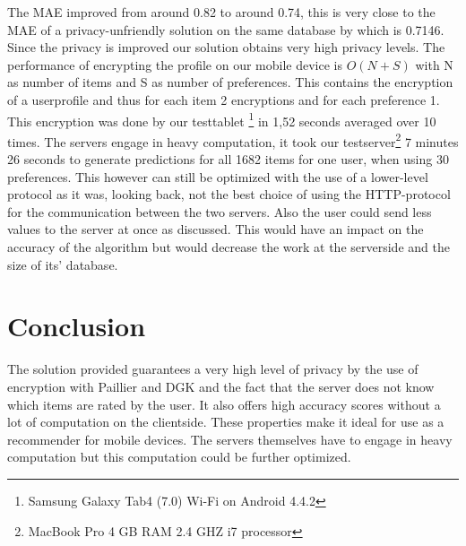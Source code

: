\documentclass[twocolumn]{phdsymp} %
\begin{document}
The MAE improved from around 0.82 to around 0.74, this is very close to the MAE of a privacy-unfriendly solution on the same database by \cite{rand} which is 0.7146. Since the privacy is improved our solution  obtains very high privacy levels. The performance of encrypting the profile on our mobile device is $O(N+S)$ with N as number of items and S as number of preferences. This contains the encryption of a userprofile and thus for each item 2 encryptions and for each preference 1. This encryption was done by our testtablet \footnote{Samsung Galaxy Tab4 (7.0) Wi-Fi on Android 4.4.2} in 1,52 seconds averaged over 10 times. The servers engage in heavy computation, it took our testserver\footnote{MacBook Pro 4 GB RAM 2.4 GHZ i7 processor} 7 minutes 26 seconds to generate predictions for all 1682 items for one user, when using 30 preferences. This however can still be optimized with the use of a lower-level protocol as it was, looking back, not the best choice of using the HTTP-protocol for the communication between the two servers. Also the user could send less values to the server at once as discussed. This would have an impact on the accuracy of the algorithm but would decrease the work at the serverside and the size of its' database.

 
\section{Conclusion}

The solution provided guarantees a very high level of privacy by the use of encryption with Paillier and DGK and the fact that the server does not know which items are rated by the user. It also offers high accuracy scores without a lot of computation on the clientside. These properties make it ideal for use as a recommender for mobile devices. The servers themselves have to engage in heavy computation but this computation could be further optimized.








\nocite{*}

\end{document}
